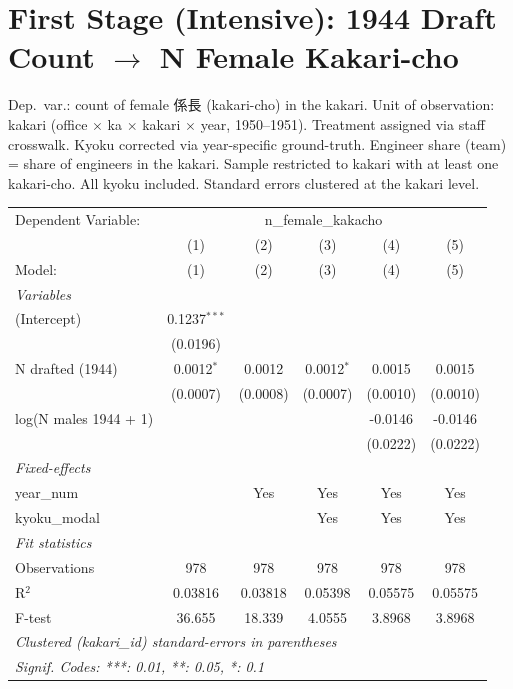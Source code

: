 \documentclass[11pt]{article}
\begin{document}
\section*{First Stage (Intensive): 1944 Draft Count $\rightarrow$ N Female Kakari-cho}
\vspace{0.5em}
{\footnotesize Dep.\ var.: count of female 係長 (kakari-cho) in the kakari.
Unit of observation: kakari (office $\times$ ka $\times$ kakari $\times$ year, 1950--1951).
Treatment assigned via staff crosswalk. Kyoku corrected via year-specific ground-truth.
Engineer share (team) = share of engineers in the kakari.
Sample restricted to kakari with at least one kakari-cho. All kyoku included.
Standard errors clustered at the kakari level.}
\vspace{1em}
\begingroup
\centering
\begin{tabular}{lccccc}
   \tabularnewline \midrule \midrule
   Dependent Variable: & \multicolumn{5}{c}{n\_female\_kakacho}\\
                         & (1)            & (2)      & (3)          & (4)      & (5) \\   
   Model:                & (1)            & (2)      & (3)          & (4)      & (5)\\  
   \midrule
   \emph{Variables}\\
   (Intercept)           & 0.1237$^{***}$ &          &              &          &   \\   
                         & (0.0196)       &          &              &          &   \\   
   N drafted (1944)      & 0.0012$^{*}$   & 0.0012   & 0.0012$^{*}$ & 0.0015   & 0.0015\\   
                         & (0.0007)       & (0.0008) & (0.0007)     & (0.0010) & (0.0010)\\   
   log(N males 1944 + 1) &                &          &              & -0.0146  & -0.0146\\   
                         &                &          &              & (0.0222) & (0.0222)\\   
   \midrule
   \emph{Fixed-effects}\\
   year\_num             &                & Yes      & Yes          & Yes      & Yes\\  
   kyoku\_modal          &                &          & Yes          & Yes      & Yes\\  
   \midrule
   \emph{Fit statistics}\\
   Observations          & 978            & 978      & 978          & 978      & 978\\  
   R$^2$                 & 0.03816        & 0.03818  & 0.05398      & 0.05575  & 0.05575\\  
   F-test                & 36.655         & 18.339   & 4.0555       & 3.8968   & 3.8968\\  
   \midrule \midrule
   \multicolumn{6}{l}{\emph{Clustered (kakari\_id) standard-errors in parentheses}}\\
   \multicolumn{6}{l}{\emph{Signif. Codes: ***: 0.01, **: 0.05, *: 0.1}}\\
\end{tabular}
\par\endgroup
\end{document}
